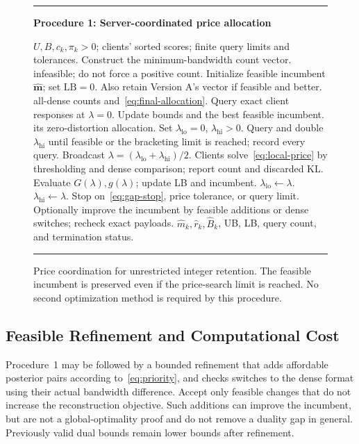 \begin{figure}[t]
\hrule\vspace{4pt}
\textbf{Procedure 1: Server-coordinated price allocation}
\vspace{3pt}
\footnotesize
\begin{algorithmic}[1]
\Require $U,B,c_k,\pi_k>0$; clients' sorted scores; finite query limits and tolerances.
\State Construct the minimum-bandwidth count vector.
 \State \Return infeasible; do not force a positive count.
\EndIf
\State Initialize feasible incumbent $\widehat{\mathbf m}$; set $\mathrm{LB}=0$.
\State Also retain Version A's vector if feasible and better.
 \State \Return all-dense counts and~\eqref{eq:final-allocation}.
\EndIf
\State Query exact client responses at $\lambda=0$.
\State Update bounds and the best feasible incumbent.
 \State \Return its zero-distortion allocation.
\EndIf
\State Set $\lambda_{\mathrm{lo}}=0$, $\lambda_{\mathrm{hi}}>0$.
\State Query and double $\lambda_{\mathrm{hi}}$ until feasible or the bracketing limit is reached; record every query.
  \State Broadcast $\lambda=(\lambda_{\mathrm{lo}}+\lambda_{\mathrm{hi}})/2$.
  \State Clients solve~\eqref{eq:local-price} by thresholding and dense comparison; report count and discarded KL.
  \State Evaluate $G(\lambda),g(\lambda)$; update LB and incumbent.
   \State $\lambda_{\mathrm{lo}}\gets\lambda$.
  \Else
   \State $\lambda_{\mathrm{hi}}\gets\lambda$.
  \EndIf
  \State Stop on~\eqref{eq:gap-stop}, price tolerance, or query limit.
 \EndFor
\EndIf
\State Optionally improve the incumbent by feasible additions or dense switches; recheck exact payloads.
\State \Return $\widehat m_k,\widehat r_k,\widehat B_k$, UB, LB, query count, and termination status.
\end{algorithmic}
\vspace{4pt}\hrule
\caption{Price coordination for unrestricted integer retention. The feasible incumbent is preserved even if the price-search limit is reached. No second optimization method is required by this procedure.}
\label{fig:algorithm}
\end{figure}

\subsection{Feasible Refinement and Computational Cost}
Procedure~1 may be followed by a bounded refinement that adds affordable posterior pairs according to~\eqref{eq:priority}, and checks switches to the dense format using their actual bandwidth difference. Accept only feasible changes that do not increase the reconstruction objective. Such additions can improve the incumbent, but are not a global-optimality proof and do not remove a duality gap in general. Previously valid dual bounds remain lower bounds after refinement.

